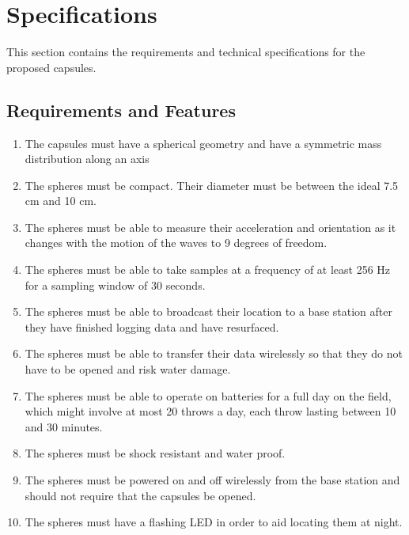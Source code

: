 \section{Specifications}
This section contains the requirements and technical specifications for the proposed capsules.  

\subsection{Requirements and Features}
\begin{enumerate}
\item The capsules must have a spherical geometry and have a symmetric mass distribution along an axis

\item The spheres must be compact.  Their diameter must be between the ideal 7.5 cm and 10 cm.

\item The spheres must be able to measure their acceleration and orientation as it changes with the motion of the waves to 9 degrees of freedom.

\item The spheres must be able to take samples at a frequency of at least 256 Hz for a sampling window of 30 seconds.

\item The spheres must be able to broadcast their location to a base station after they have finished logging data and have resurfaced.

\item The spheres must be able to transfer their data wirelessly so that they do not have to be opened and risk water damage.

\item The spheres must be able to operate on batteries for a full day on the field, which might involve at most 20 throws a day, each throw lasting between 10 and 30 minutes.

\item The spheres must be shock resistant and water proof.

\item The spheres must be powered on and off wirelessly from the base station and should not require that the capsules be opened.

\item The spheres must have a flashing LED in order to aid locating them at night.
\end{enumerate}

